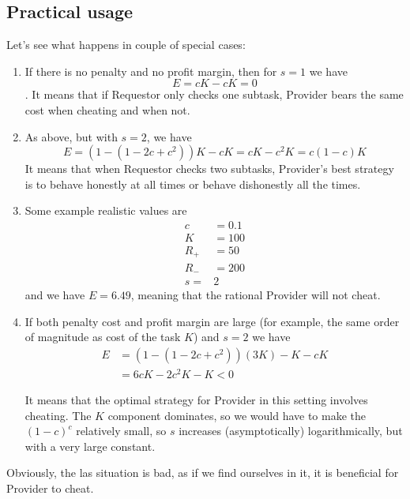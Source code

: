 \documentclass{winnower}
\begin{document}
\subsection{Practical usage}
Let's see what happens in couple of special cases:
\begin{enumerate}
\item If there is no penalty and no profit margin, then for $s=1$ we have $$E = cK - cK = 0$$. It means that if Requestor only checks one subtask, Provider bears the same cost when cheating and when not.
\item As above, but with $s=2$, we have $$ E = (1 - (1 - 2c + c^2))K - cK = cK - c^2K = c(1 - c)K $$ It means that when Requestor checks two subtasks, Provider's best strategy is to behave honestly at all times or behave dishonestly all the times.
\item Some example realistic values are
\begin{equation}
\begin{aligned}
c &= 0.1 \\
K &= 100 \\
R_{+} &= 50 \\
R_{-} &= 200 \\
s =& 2
\end{aligned}
\end{equation}
and we have $E = 6.49$, meaning that the rational Provider will not cheat.
\item If both penalty cost and profit margin are large (for example, the same order of magnitude as cost of the task $K$) and $s = 2$ we have
\begin{equation}
\begin{aligned}
E &= (1 - (1 - 2c + c^2))(3K) - K - cK \\
  &= 6cK - 2c^2K - K < 0
\end{aligned}
\end{equation}

It means that the optimal strategy for Provider in this setting involves cheating. The $K$ component dominates, so we would have to make the $(1-c)^c$ relatively small, so $s$ increases (asymptotically) logarithmically, but with a very large constant.
\end{enumerate}

Obviously, the las situation is bad, as if we find ourselves in it, it is beneficial for Provider to cheat.
\end{document}
